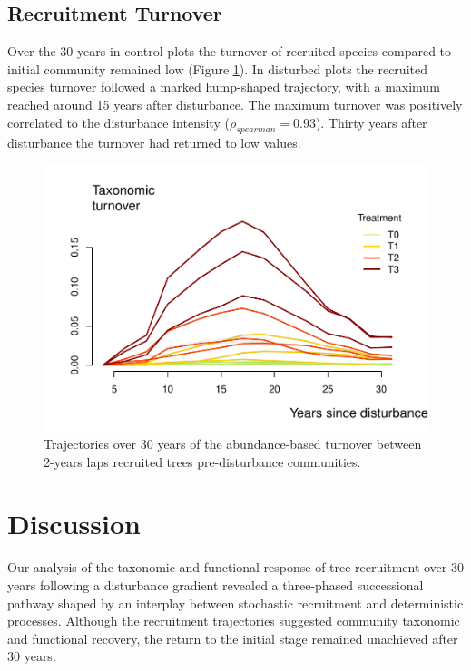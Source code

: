 \documentclass[fleqn,10pt]{ArtEcoFoG} %
\begin{document}
\subsection{Recruitment Turnover}\label{recruitment-turnover}

Over the 30 years in control plots the turnover of recruited species
compared to initial community remained low (Figure \ref{fig:Turnover}).
In disturbed plots the recruited species turnover followed a marked
hump-shaped trajectory, with a maximum reached around 15 years after
disturbance. The maximum turnover was positively correlated to the
disturbance intensity (\(\rho_{spearman}=0.93\)). Thirty years after
disturbance the turnover had returned to low values.

\begin{figure}

{\centering \includegraphics[width=1\linewidth]{RecruitmentTrajectories_files/figure-latex/Turnover-1} 

}

\caption{Trajectories over 30 years of the abundance-based turnover between 2-years laps recruited trees pre-disturbance communities.}\label{fig:Turnover}
\end{figure}

\section{Discussion}\label{discussion}

\color{red} Our analysis of the taxonomic and functional response of
tree recruitment over 30 years following a disturbance gradient revealed
a three-phased successional pathway shaped by an interplay between
stochastic recruitment and deterministic processes. Although the
recruitment trajectories suggested community taxonomic and functional
recovery, the return to the initial stage remained unachieved after 30
years.
\end{document}
